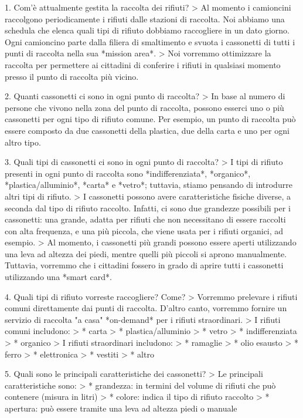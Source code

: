 \begin{markdown}
    1. Com'è attualmente gestita la raccolta dei rifiuti?
    > Al momento i camioncini raccolgono periodicamente i rifiuti dalle stazioni di raccolta. Noi abbiamo una schedula che elenca quali tipi di rifiuto dobbiamo raccogliere in un dato giorno. Ogni camioncino parte dalla filiera di smaltimento e svuota i cassonetti di tutti i punti di raccolta nella sua *mission area*.
    > Noi vorremmo ottimizzare la raccolta per permettere ai cittadini di conferire i rifiuti in qualsiasi momento presso il punto di raccolta più vicino.

    2. Quanti cassonetti ci sono in ogni punto di raccolta?
    > In base al numero di persone che vivono nella zona del punto di raccolta, possono esserci uno o più cassonetti per ogni tipo di rifiuto comune. Per esempio, un punto di raccolta può essere composto da due cassonetti della plastica, due della carta e uno per ogni altro tipo.

    3. Quali tipi di cassonetti ci sono in ogni punto di raccolta?
    > I tipi di rifiuto presenti in ogni punto di raccolta sono *indifferenziata*, *organico*, *plastica/alluminio*, *carta* e *vetro*; tuttavia, stiamo pensando di introdurre altri tipi di rifiuto.
    > I cassonetti possono avere caratteristiche fisiche diverse, a seconda dal tipo di rifiuto raccolto. Infatti, ci sono due grandezze possibili per i cassonetti: una grande, adatta per rifiuti che non necessitano di essere raccolti con alta frequenza, e una più piccola, che viene usata per i rifiuti organici, ad esempio.
    > Al momento, i cassonetti più grandi possono essere aperti utilizzando una leva ad altezza dei piedi, mentre quelli più piccoli si aprono manualmente. Tuttavia, vorremmo che i cittadini fossero in grado di aprire tutti i cassonetti utilizzando una *smart card*.

    4. Quali tipi di rifiuto vorreste raccogliere? Come?
    > Vorremmo prelevare i rifiuti comuni direttamente dai punti di raccolta. D'altro canto, vorremmo fornire un servizio di raccolta "a casa" *on-demand* per i rifiuti straordinari.
    > I rifiuti comuni includono:
    > * carta
    > * plastica/alluminio
    > * vetro
    > * indifferenziata
    > * organico
    > I rifiuti straordinari includono:
    > * ramaglie
    > * olio esausto
    > * ferro
    > * elettronica
    > * vestiti
    > * altro

    5. Quali sono le principali caratteristiche dei cassonetti?
    > Le principali caratteristiche sono:
    > * grandezza: in termini del volume di rifiuti che può contenere (misura in litri)
    > * colore: indica il tipo di rifiuto raccolto
    > * apertura: può essere tramite una leva ad altezza piedi o manuale


\end{markdown}
